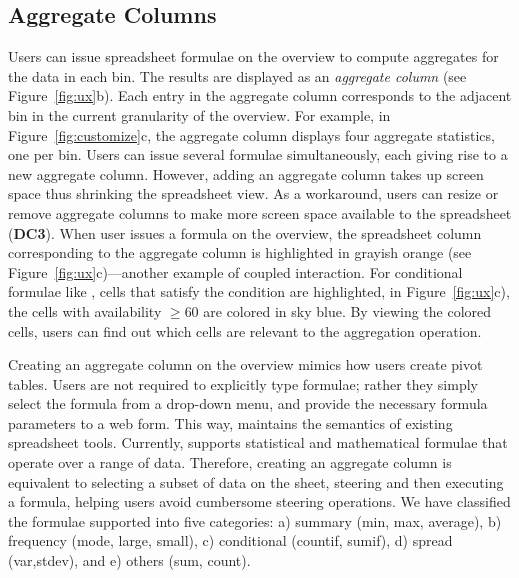 \subsection{Aggregate Columns}
Users can issue spreadsheet formulae
on the overview
to compute aggregates for the data
in each bin.
The results
are displayed as an {\em aggregate column} (see Figure~\ref{fig:ux}b). Each entry in the aggregate column
corresponds to the adjacent bin
in the current granularity
of the overview.
For example, in Figure~\ref{fig:customize}c,
the aggregate column displays
four aggregate statistics,
one per bin.
Users can issue several formulae simultaneously,
each giving rise to a new aggregate column.
However, adding an aggregate column
takes up screen space thus shrinking the spreadsheet view.
As a workaround, users can resize or
remove aggregate columns
to make more screen space available
to the spreadsheet (\textbf{DC3}).
When user issues a formula on the overview,
the spreadsheet column
corresponding to the aggregate column
is highlighted in grayish orange
(see Figure~\ref{fig:ux}c)---another example of coupled interaction.
For conditional formulae like ,
cells that satisfy the condition
are highlighted, \eg in Figure~\ref{fig:ux}c),
the cells with availability $\ge 60$ are colored in sky blue.
By viewing the colored cells,
users can find out which cells
are relevant to the aggregation operation.

Creating an aggregate column on the overview mimics how users create pivot tables. Users
are not required to explicitly type formulae;
rather they simply select the formula from a drop-down menu,
and provide the necessary formula parameters to a web form.
This way, \noah maintains the semantics
of existing spreadsheet tools.
Currently, \noah supports statistical
and mathematical formulae that
operate over a range of data.
Therefore, creating an aggregate column
is equivalent to selecting a subset of data
on the sheet, \ie steering and then executing a formula,
helping users avoid cumbersome steering operations.
We have classified the formulae supported
into five categories: a) summary (\eg min, max, average),
b) frequency (\eg mode, large, small), c) conditional (\eg countif, sumif), d) spread (\eg var,stdev), and e) others (\eg sum, count).

